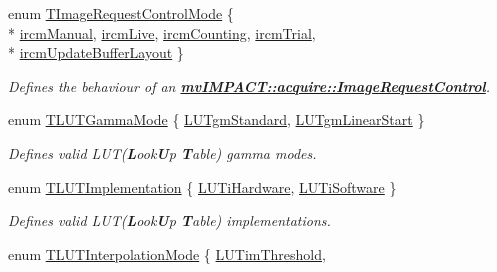 \begin{DoxyCompactItemize}
enum \hyperlink{group___common_interface_ga9e620f0553e3519d83067243240c4518}{T\+Image\+Request\+Control\+Mode} \{ \\*
\hyperlink{group___common_interface_gga9e620f0553e3519d83067243240c4518a9b5eb0b82460ccdf4341a17f2357af97}{ircm\+Manual}, 
\hyperlink{group___common_interface_gga9e620f0553e3519d83067243240c4518aa7795ea8dcb6388b58e33dd10a37e5a4}{ircm\+Live}, 
\hyperlink{group___common_interface_gga9e620f0553e3519d83067243240c4518a0f31a2850d5fae8a76ecd35536bdc747}{ircm\+Counting}, 
\hyperlink{group___common_interface_gga9e620f0553e3519d83067243240c4518ad89e80d85a867ab28fcb03b86ecd7371}{ircm\+Trial}, 
\\*
\hyperlink{group___common_interface_gga9e620f0553e3519d83067243240c4518a287af4d17847600a3e86a984dec77094}{ircm\+Update\+Buffer\+Layout}
 \}
\begin{DoxyCompactList}\small\item\em Defines the behaviour of an {\bfseries \hyperlink{classmv_i_m_p_a_c_t_1_1acquire_1_1_image_request_control}{mv\+I\+M\+P\+A\+C\+T\+::acquire\+::\+Image\+Request\+Control}}. \end{DoxyCompactList}\item 
enum \hyperlink{group___common_interface_gab9c7c29f6e598477f67fefe0b30addb0}{T\+L\+U\+T\+Gamma\+Mode} \{ \hyperlink{group___common_interface_ggab9c7c29f6e598477f67fefe0b30addb0a8fcb1fb5e3cead596b428f6d027ff6d6}{L\+U\+Tgm\+Standard}, 
\hyperlink{group___common_interface_ggab9c7c29f6e598477f67fefe0b30addb0a7cf4e665dcebf8004ce9434395b89f0c}{L\+U\+Tgm\+Linear\+Start}
 \}
\begin{DoxyCompactList}\small\item\em Defines valid L\+U\+T({\bfseries L}ook{\bfseries U}p {\bfseries T}able) gamma modes. \end{DoxyCompactList}\item 
enum \hyperlink{group___common_interface_ga7ba807ea2d27f199703d303b0901e243}{T\+L\+U\+T\+Implementation} \{ \hyperlink{group___common_interface_gga7ba807ea2d27f199703d303b0901e243a18d657c7fbed42de8199c47ff10687aa}{L\+U\+Ti\+Hardware}, 
\hyperlink{group___common_interface_gga7ba807ea2d27f199703d303b0901e243aa4a71a15110d6d354923aa6ecae1998f}{L\+U\+Ti\+Software}
 \}
\begin{DoxyCompactList}\small\item\em Defines valid L\+U\+T({\bfseries L}ook{\bfseries U}p {\bfseries T}able) implementations. \end{DoxyCompactList}\item 
enum \hyperlink{group___common_interface_ga40d5450344b3aaaf127544ef3985cfbb}{T\+L\+U\+T\+Interpolation\+Mode} \{ \hyperlink{group___common_interface_gga40d5450344b3aaaf127544ef3985cfbbab270cac40a897cf1ad142f192f4bcc85}{L\+U\+Tim\+Threshold}, 

\end{DoxyCompactItemize}
